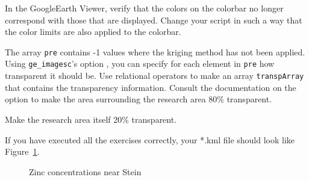 \begin{action}
In the GoogleEarth Viewer, verify that the colors on the colorbar no longer correspond with those that are displayed. Change your script in such a way that the color limits are also applied to the colorbar.
\end{action}

\begin{action}
The array {\tt pre} contains -1 values where the kriging method has not been applied. Using {\tt ge\_imagesc}'s option {\tt {}}, you can specify for each element in {\tt pre} how transparent it should be. Use relational operators to make an array {\tt transpArray} that contains the transparency information. Consult the documentation on the option {\tt {}} to make the area surrounding the research area 80\% transparent.
\end{action}

\begin{action}
Make the research area itself 20\% transparent.
\end{action}





\vspace{1em}
\noindent If you have executed all the exercises correctly, your *.kml file should look like Figure~\ref{fig:zinc-stein}.

\begin{figure}[!htbp]
  \centering
  \caption{Zinc concentrations near Stein}\label{fig:zinc-stein}
\end{figure}



%
%
%



\projectfooter



